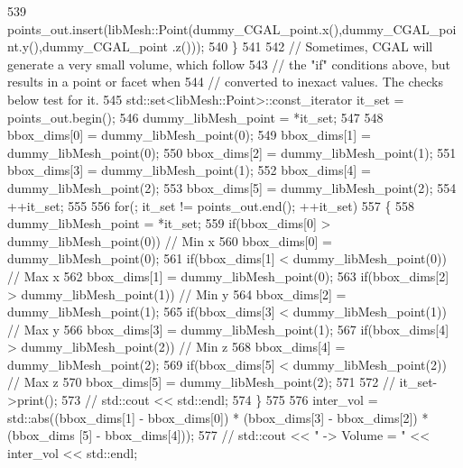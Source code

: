 \begin{DoxyCode}
539                 points\_out.insert(libMesh::Point(dummy\_CGAL\_point.x(),dummy\_CGAL\_point.y(),dummy\_CGAL\_point
      .z()));
540             \}
541 
542             \textcolor{comment}{// Sometimes, CGAL will generate a very small volume, which follow}
543             \textcolor{comment}{// the "if" conditions above, but results in a point or facet when}
544             \textcolor{comment}{// converted to inexact values. The checks below test for it.}
545             std::set<libMesh::Point>::const\_iterator it\_set = points\_out.begin();
546             dummy\_libMesh\_point = *it\_set;
547 
548             bbox\_dims[0] = dummy\_libMesh\_point(0);
549             bbox\_dims[1] = dummy\_libMesh\_point(0);
550             bbox\_dims[2] = dummy\_libMesh\_point(1);
551             bbox\_dims[3] = dummy\_libMesh\_point(1);
552             bbox\_dims[4] = dummy\_libMesh\_point(2);
553             bbox\_dims[5] = dummy\_libMesh\_point(2);
554             ++it\_set;
555 
556             \textcolor{keywordflow}{for}(; it\_set != points\_out.end(); ++it\_set)
557             \{
558                 dummy\_libMesh\_point = *it\_set;
559                 \textcolor{keywordflow}{if}(bbox\_dims[0] > dummy\_libMesh\_point(0)) \textcolor{comment}{// Min x}
560                     bbox\_dims[0] = dummy\_libMesh\_point(0);
561                 \textcolor{keywordflow}{if}(bbox\_dims[1] < dummy\_libMesh\_point(0)) \textcolor{comment}{// Max x}
562                     bbox\_dims[1] = dummy\_libMesh\_point(0);
563                 \textcolor{keywordflow}{if}(bbox\_dims[2] > dummy\_libMesh\_point(1)) \textcolor{comment}{// Min y}
564                     bbox\_dims[2] = dummy\_libMesh\_point(1);
565                 \textcolor{keywordflow}{if}(bbox\_dims[3] < dummy\_libMesh\_point(1)) \textcolor{comment}{// Max y}
566                     bbox\_dims[3] = dummy\_libMesh\_point(1);
567                 \textcolor{keywordflow}{if}(bbox\_dims[4] > dummy\_libMesh\_point(2)) \textcolor{comment}{// Min z}
568                     bbox\_dims[4] = dummy\_libMesh\_point(2);
569                 \textcolor{keywordflow}{if}(bbox\_dims[5] < dummy\_libMesh\_point(2)) \textcolor{comment}{// Max z}
570                     bbox\_dims[5] = dummy\_libMesh\_point(2);
571 
572 \textcolor{comment}{//              it\_set->print();}
573 \textcolor{comment}{//              std::cout << std::endl;}
574             \}
575 
576             inter\_vol = std::abs((bbox\_dims[1] - bbox\_dims[0]) * (bbox\_dims[3] - bbox\_dims[2]) * (bbox\_dims
      [5] - bbox\_dims[4]));
577 \textcolor{comment}{//          std::cout << " -> Volume = " << inter\_vol << std::endl;}

\end{DoxyCode}
